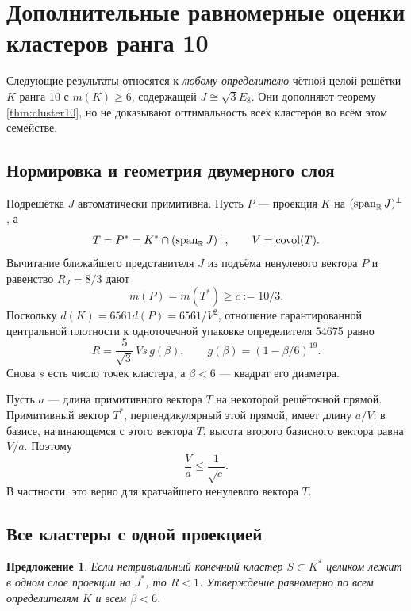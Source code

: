 \documentclass[11pt,a4paper]{article}
\newtheorem{proposition}[theorem]{Предложение}
\theoremstyle{remark}\newtheorem{remark}[theorem]{Замечание}
\newcommand{\spanR}{\operatorname{span}_{\R}}\newcommand{\diag}{\operatorname{diag}}
\begin{document}
\newpage
\appendix
\section{Дополнительные равномерные оценки кластеров ранга 10}\label{app:uniform10}

Следующие результаты относятся к \emph{любому определителю} чётной целой решётки $K$ ранга 10 с $m(K)\ge6$, содержащей $J\cong\sqrt3E_8$. Они дополняют теорему \ref{thm:cluster10}, но не доказывают оптимальность всех кластеров во всём этом семействе.

\subsection{Нормировка и геометрия двумерного слоя}

Подрешётка $J$ автоматически примитивна. Пусть $P$ --- проекция $K$ на $(\spanR J)^\perp$, а
\[
T=P^*=K^*\cap(\spanR J)^\perp,\qquad V=\operatorname{covol}(T).
\]
Вычитание ближайшего представителя $J$ из подъёма ненулевого вектора $P$ и равенство $R_J=8/3$ дают
\[
m(P)=m(T^*)\ge c:=10/3.
\]
Поскольку $d(K)=6561d(P)=6561/V^2$, отношение гарантированной центральной плотности к одноточечной упаковке определителя 54675 равно
\begin{equation}\label{eq:uniform10ratio}
R=\frac5{\sqrt3}\,V s\,g(\beta),\qquad
g(\beta)=(1-\beta/6)^{19}.
\end{equation}
Снова $s$ есть число точек кластера, а $\beta<6$ --- квадрат его диаметра.

Пусть $a$ --- длина примитивного вектора $T$ на некоторой решёточной прямой. Примитивный вектор $T^*$, перпендикулярный этой прямой, имеет длину $a/V$: в базисе, начинающемся с этого вектора $T$, высота второго базисного вектора равна $V/a$. Поэтому
\begin{equation}\label{eq:planarspacing}
\frac Va\le\frac1{\sqrt c}.
\end{equation}
В частности, это верно для кратчайшего ненулевого вектора $T$.

\subsection{Все кластеры с одной проекцией}

\begin{proposition}\label{prop:onefiber10}
Если нетривиальный конечный кластер $S\subset K^*$ целиком лежит в одном слое проекции на $J^*$, то $R<1$. Утверждение равномерно по всем определителям $K$ и всем $\beta<6$.
\end{proposition}
\end{document}
